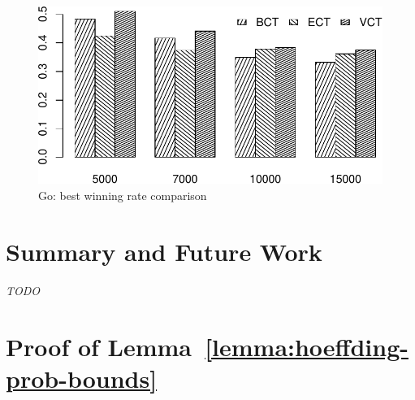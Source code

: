 \documentclass{article}
\begin{document}
\begin{figure}[h]
\centering
\includegraphics[scale=0.8]{bests-bw.pdf}
\caption{Go: best winning rate comparison}
\label{fig:best-winning-rate}
\end{figure}

\section{Summary and Future Work}

\textit{TODO}

\clearpage

\appendix

\section{Proof of Lemma~\ref{lemma:hoeffding-prob-bounds}}
\label{app:hoeffding-prob-bounds-proof}
\end{document}
